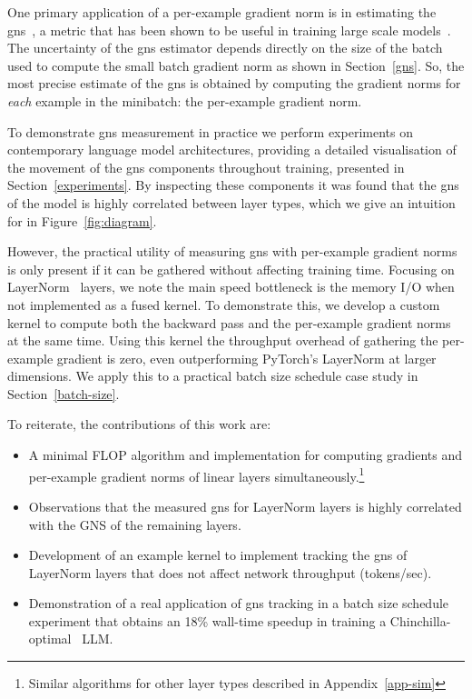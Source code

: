 \documentclass{article}
\begin{document}
One primary application of a per-example gradient norm is in estimating the
\ac{gns}~\citep{mccandlish2018empirical}, a metric that has been shown to be
useful in training large scale models~\citep{brown2020language}. The uncertainty
of the \ac{gns} estimator depends directly on the size of the batch used to
compute the small batch gradient norm as shown in Section~\ref{gns}. So, the
most precise estimate of the \ac{gns} is obtained by computing the gradient
norms for \emph{each} example in the minibatch: the per-example gradient norm.

To demonstrate \ac{gns} measurement in practice we perform experiments on
contemporary language model architectures, providing a detailed visualisation
of the movement of the \ac{gns} components throughout training, presented
in Section~\ref{experiments}. By inspecting these components it was found
that the \ac{gns} of the model is highly correlated between layer types,
which we give an intuition for in Figure~\ref{fig:diagram}.

However, the practical utility of measuring \ac{gns} with per-example gradient
norms is only present if it can be gathered without affecting training time.
Focusing on LayerNorm~\citep{ba2016layer} layers, we note the main speed
bottleneck is the memory I/O when not implemented as a fused kernel. To
demonstrate this, we develop a custom kernel to compute both the backward pass
and the per-example gradient norms at the same time. Using this kernel the
throughput overhead of gathering the per-example gradient is zero, even
outperforming PyTorch's LayerNorm at larger dimensions. We apply this to
a practical batch size schedule case study in Section~\ref{batch-size}.

To reiterate, the contributions of this work are:

\begin{itemize}
    \item A minimal FLOP algorithm and implementation for computing gradients
        and per-example gradient norms of linear layers
        simultaneously.\footnote{Similar algorithms for other layer types
        described in Appendix~\ref{app-sim}}
    \item Observations that the measured \ac{gns} for LayerNorm layers is highly
        correlated with the GNS of the remaining layers.
    \item Development of an example kernel to implement tracking the \ac{gns} of
        LayerNorm layers that does not affect network throughput (tokens/sec).
    \item Demonstration of a real application of \ac{gns} tracking in a batch
        size schedule experiment that obtains an 18\% wall-time speedup in
        training a Chinchilla-optimal~\citep{hoffmann2022training} LLM.
\end{itemize}
\end{document}
